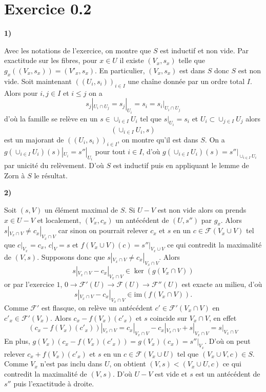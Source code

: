 \documentclass[a4paper,12pt]{article}
\newcommand{\F}{\mathscr F}
\newcommand{\im}{\textrm{im}}
\theoremstyle{plain}
\theoremstyle{definition}
\theoremstyle{remark}
\begin{document}
\section*{Exercice 0.2}
\begin{center}
	\textbf{1)}
\end{center}
Avec les notations de l'exercice, on montre que $S$ est inductif et 
non vide. Par exactitude sur les fibres, pour $x\in U$ il existe 
$(V_x, s_x)$ telle que $g_x((V_x,s_x))=(V'_x,s_x)$. En particulier,
$(V_x,s_x)$ est dans $S$ donc $S$ est non vide.
Soit maintenant $((U_i, s_i))_{i\in I}$ une chaîne donnée par un ordre
total $I$. Alors pour $i,j\in I$ et $i\leq j$ on a 
\[s_j|_{U_i\cap U_j}=s_j|_{U_i}=s_i=s_i|_{U_i\cap U_j}\]
d'où la famille se relève en un $s\in \cup_{i\in I} U_i$ tel que 
$s|_{U_i}=s_i$ et $U_i\subset \cup_{j\in I}U_j$ alors 
\[(\cup_{i\in I} U_i, s)\]
est un majorant de $((U_i,s_i))_{i\in I}$, on montre qu'il est dans $S$.
On a $g(\cup_{i\in I} U_i)(s)|_{U_i}=s''|_{U_i}$ pour tout $i\in I$,
d'où $g(\cup_{i\in I} U_i)(s)=s''|_{\cup_{i\in I} U_i}$ par unicité 
du relèvement. D'où $S$ est inductif puis en appliquant le lemme
de Zorn à $S$ le résultat.
\begin{center}
	\textbf{2)}
\end{center}
Soit $(s, V)$ un élément maximal de $S$. Si $U-V$ est non vide alors on 
prends $x\in U-V$ et localement, $(V_x, c_x)$ un antécédent de 
$(U,s'')$ par $g_x$. Alors $s|_{V_x\cap V}\ne c_x|_{V_x\cap V}$ car
sinon on pourrait relever $c_x$ et $s$ en un $c\in \F(V_x\cup V)$
tel que $c|_{V_x}=c_x$, $c|_{V}=s$ et $f(V_x\cup V)(c)=s''|_{V_x\cup V}$
ce qui contredit la maximalité de $(V,s)$. Supposons donc que 
$s|_{V_x\cap V}\ne c_x|_{V_x\cap V}$. Alors 
\[s|_{V_x\cap V}- c_x|_{V_x\cap V}\in \ker(g(V_x\cap V))\]
or par l'exercice $1$, $0\to \F'(U)\to \F(U)\to \F''(U)$
est exacte au milieu, d'où \[s|_{V_x\cap V}- c_x|_{V_x\cap V}\in 
\im(f(V_x\cap V)).\]
Comme $\F'$ est flasque, on relève un antécédent $c'\in \F'(V_x\cap V)$
en $c'_x\in \F'(V_x)$. Alors $c_x-f(V_x)(c'_x)$ et $s$ coincide 
sur $V_x\cap V$, en effet 
\[(c_x-f(V_x)(c'_x))|_{V_x\cap V}= c_x|_{V_x\cap V}-c_x|_{V_x\cap V}
+s|_{V_x\cap V}=s|_{V_x\cap V}\]
En plus, $g(V_x)(c_x-f(V_x)(c'_x))=g(V_x)(c_x)=s''|_{V_x}$. D'où
on peut relever $c_x+f(V_x)(c'_x)$ et $s$ en un $c\in \F(V_x\cup U)$
tel que $(V_x\cup V, c)\in S$.
Comme $V_x$ n'est pas inclu dans $U$, on obtient $(V,s)<(V_x\cup U, c)$
ce qui contredit la maximalité de $(V,s)$. D'où $U-V$ est vide 
et $s$ est un antécédent de $s''$ puis l'exactitude à droite.
\end{document}

